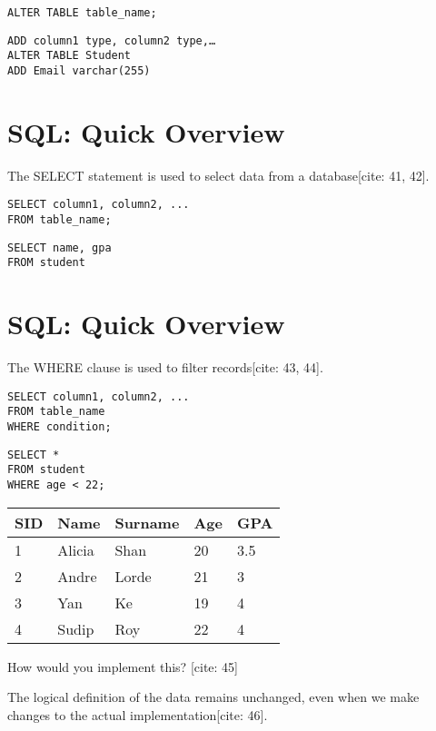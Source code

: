 \documentclass{article}
\begin{document}
\begin{verbatim}
ALTER TABLE table_name;
\end{verbatim}

\begin{verbatim}
ADD column1 type, column2 type,…
ALTER TABLE Student
ADD Email varchar(255)
\end{verbatim}

\section*{SQL: Quick Overview}

The SELECT statement is used to select data from a database[cite: 41, 42].

\begin{verbatim}
SELECT column1, column2, ...
FROM table_name;
\end{verbatim}

\begin{verbatim}
SELECT name, gpa
FROM student
\end{verbatim}

\section*{SQL: Quick Overview}

The WHERE clause is used to filter records[cite: 43, 44].

\begin{verbatim}
SELECT column1, column2, ...
FROM table_name
WHERE condition;
\end{verbatim}

\begin{verbatim}
SELECT *
FROM student
WHERE age < 22;
\end{verbatim}

\begin{tabular}{lllll}
\hline
SID & Name & Surname & Age & GPA \\
\hline
1 & Alicia & Shan & 20 & 3.5 \\
2 & Andre & Lorde & 21 & 3 \\
3 & Yan & Ke & 19 & 4 \\
4 & Sudip & Roy & 22 & 4 \\
\hline
\end{tabular}

How would you implement this? [cite: 45]

The logical definition of the data remains unchanged, even when we make changes to the actual implementation[cite: 46].
\end{document}
